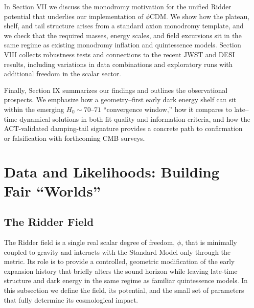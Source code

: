 \documentclass[a4paper,11pt]{article}
\begin{document}
In Section VII we discuss the monodromy motivation for the unified Ridder potential that underlies our implementation of $\phi$CDM. We show how the plateau, shelf, and tail structure arises from a standard axion monodromy template, and we check that the required masses, energy scales, and field excursions sit in the same regime as existing monodromy inflation and quintessence models. Section VIII collects robustness tests and connections to the recent JWST and DESI results, including variations in data combinations and exploratory runs with additional freedom in the scalar sector.

Finally, Section IX summarizes our findings and outlines the observational prospects. We emphasize how a geometry--first early dark energy shelf can sit within the emerging $H_0 \sim 70$--$71$ ``convergence window,'' how it compares to late--time dynamical solutions in both fit quality and information criteria, and how the ACT-validated damping-tail signature provides a concrete path to confirmation or falsification with forthcoming CMB surveys.


\section{Data and Likelihoods: Building Fair ``Worlds''}


\subsection{The Ridder Field}
\label{sec:ridder_field}

The Ridder field is a single real scalar degree of freedom, $\phi$, that is minimally coupled to gravity and interacts with the Standard Model only through the metric. Its role is to provide a controlled, geometric modification of the early expansion history that briefly alters the sound horizon while leaving late-time structure and dark energy in the same regime as familiar quintessence models. In this subsection we define the field, its potential, and the small set of parameters that fully determine its cosmological impact.
\end{document}
